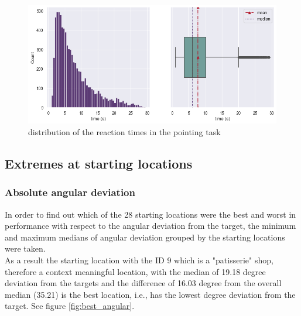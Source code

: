 \begin{enumerate}
	\begin{figure}[h]
		\centering
		\includegraphics[width=150mm]{figures/RT_hist_box_23.png}
		\caption[Distribution of reaction times]{distribution of the  reaction times in the pointing task}
		\label{fig:rt_dists}
	\end{figure}
	
\end{enumerate}

\subsection{Extremes at starting locations}

\subsubsection{Absolute angular deviation}

In order to find out which of the 28 starting locations were the best and worst in performance with respect to the angular deviation from the target, the minimum and maximum medians of angular deviation grouped by the starting locations were taken.\\
As a result the starting location with the ID 9 which is a "patisserie" shop, therefore a context meaningful location, with the median of 19.18 degree deviation from the targets and the difference of 16.03 degree from the overall median (35.21) is the best location, i.e., has the lowest degree deviation from the target. See figure \ref{fig:best_angular}.\\

